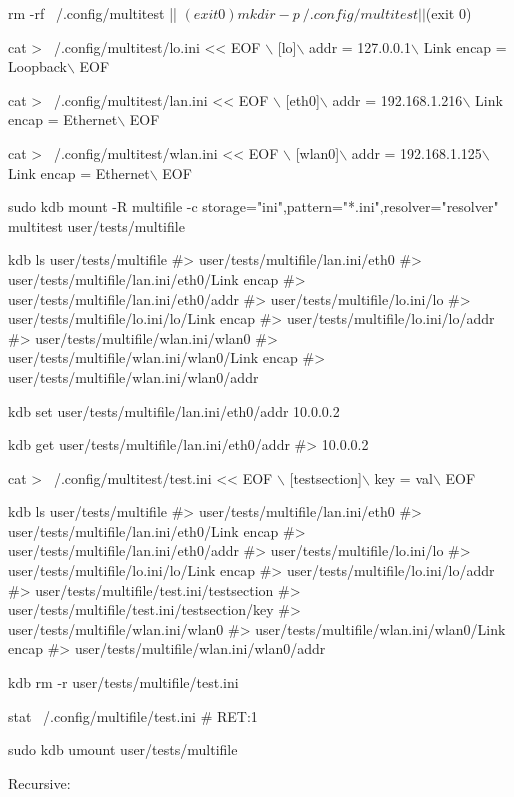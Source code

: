 \begin{DoxyCode}
rm -rf ~/.config/multitest || $(exit 0)
mkdir -p ~/.config/multitest || $(exit 0)

cat > ~/.config/multitest/lo.ini << EOF \(\backslash\)
[lo]\(\backslash\)
addr = 127.0.0.1\(\backslash\)
Link encap = Loopback\(\backslash\)
EOF

cat > ~/.config/multitest/lan.ini << EOF \(\backslash\)
[eth0]\(\backslash\)
addr = 192.168.1.216\(\backslash\)
Link encap = Ethernet\(\backslash\)
EOF

cat > ~/.config/multitest/wlan.ini << EOF \(\backslash\)
[wlan0]\(\backslash\)
addr = 192.168.1.125\(\backslash\)
Link encap = Ethernet\(\backslash\)
EOF

sudo kdb mount -R multifile -c storage="ini",pattern="*.ini",resolver="resolver" multitest
       user/tests/multifile

kdb ls user/tests/multifile
#> user/tests/multifile/lan.ini/eth0
#> user/tests/multifile/lan.ini/eth0/Link encap
#> user/tests/multifile/lan.ini/eth0/addr
#> user/tests/multifile/lo.ini/lo
#> user/tests/multifile/lo.ini/lo/Link encap
#> user/tests/multifile/lo.ini/lo/addr
#> user/tests/multifile/wlan.ini/wlan0
#> user/tests/multifile/wlan.ini/wlan0/Link encap
#> user/tests/multifile/wlan.ini/wlan0/addr

kdb set user/tests/multifile/lan.ini/eth0/addr 10.0.0.2

kdb get user/tests/multifile/lan.ini/eth0/addr
#> 10.0.0.2

cat > ~/.config/multitest/test.ini << EOF \(\backslash\)
[testsection]\(\backslash\)
key = val\(\backslash\)
EOF

kdb ls user/tests/multifile
#> user/tests/multifile/lan.ini/eth0
#> user/tests/multifile/lan.ini/eth0/Link encap
#> user/tests/multifile/lan.ini/eth0/addr
#> user/tests/multifile/lo.ini/lo
#> user/tests/multifile/lo.ini/lo/Link encap
#> user/tests/multifile/lo.ini/lo/addr
#> user/tests/multifile/test.ini/testsection
#> user/tests/multifile/test.ini/testsection/key
#> user/tests/multifile/wlan.ini/wlan0
#> user/tests/multifile/wlan.ini/wlan0/Link encap
#> user/tests/multifile/wlan.ini/wlan0/addr

kdb rm -r user/tests/multifile/test.ini

stat ~/.config/multifile/test.ini
# RET:1

sudo kdb umount user/tests/multifile
\end{DoxyCode}


Recursive\+:


